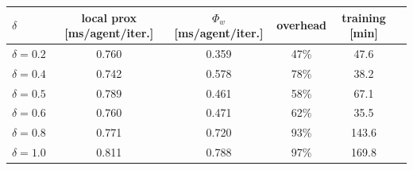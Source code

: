 
\begin{tabular}{lccccc}
\toprule
$\delta$ & local prox [ms/agent/iter.] & $\Phi_w$ [ms/agent/iter.] & overhead & training [min] \\
\midrule
$\delta=0.2$ & 0.760 & 0.359 & 47\% & 47.6 \\
$\delta=0.4$ & 0.742 & 0.578 & 78\% & 38.2 \\
$\delta=0.5$ & 0.789 & 0.461 & 58\% & 67.1 \\
$\delta=0.6$ & 0.760 & 0.471 & 62\% & 35.5 \\
$\delta=0.8$ & 0.771 & 0.720 & 93\% & 143.6 \\
$\delta=1.0$ & 0.811 & 0.788 & 97\% & 169.8 \\
\bottomrule
\end{tabular}

